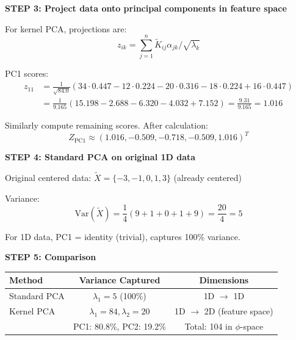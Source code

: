 \documentclass[12pt]{article}
\begin{document}
\begin{solution}
\textbf{STEP 3: Project data onto principal components in feature space}

For kernel PCA, projections are:
\[
z_{ik} = \sum_{j=1}^n \tilde{K}_{ij} \alpha_{jk} / \sqrt{\lambda_k}
\]

PC1 scores:
\begin{align*}
z_{11} &= \frac{1}{\sqrt{84.0}}(34 \cdot 0.447 - 12 \cdot 0.224 - 20 \cdot 0.316 - 18 \cdot 0.224 + 16 \cdot 0.447) \\
&= \frac{1}{9.165}(15.198 - 2.688 - 6.320 - 4.032 + 7.152) = \frac{9.31}{9.165} = 1.016
\end{align*}

Similarly compute remaining scores. After calculation:
\[
Z_{\text{PC1}} \approx (1.016, -0.509, -0.718, -0.509, 1.016)^T
\]

\textbf{STEP 4: Standard PCA on original 1D data}

Original centered data: $\tilde{X} = \{-3, -1, 0, 1, 3\}$ (already centered)

Variance:
\[
\text{Var}(\tilde{X}) = \frac{1}{4}(9 + 1 + 0 + 1 + 9) = \frac{20}{4} = 5
\]

For 1D data, PC1 = identity (trivial), captures 100\% variance.

\textbf{STEP 5: Comparison}

\begin{center}
\begin{tabular}{l|c|c}
\textbf{Method} & \textbf{Variance Captured} & \textbf{Dimensions} \\
\hline
Standard PCA & $\lambda_1 = 5$ (100\%) & 1D $\to$ 1D \\
Kernel PCA & $\lambda_1 = 84, \lambda_2 = 20$ & 1D $\to$ 2D (feature space) \\
& PC1: 80.8\%, PC2: 19.2\% & Total: 104 in $\phi$-space
\end{tabular}
\end{center}


\end{solution}
\end{document}
